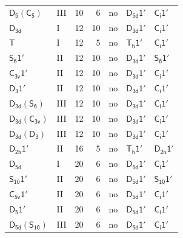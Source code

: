 \documentclass[10pt,a4paper]{article}
\numberwithin{equation}{section}
\newcommand{\grp}[1]{\mathsf{#1}}
\begin{document}
{\begin{longtable}{@{}llrrlll@{}}
\href{D5-C5.pdf}{$\grp{D_{5}}(\grp{C_{5}})$} & III & 10 & 6 & no & \href{D5d-1p.pdf}{$\grp{D_{5d}1'}$} & \href{S2-1p.pdf}{$\grp{C_{i}1'}$}\\
\href{../../../rotation/data/pdf/D3d.pdf}{$\grp{D_{3d}}$} & I & 12 & 10 & no & \href{D3d-1p.pdf}{$\grp{D_{3d}1'}$} & \href{S2-1p.pdf}{$\grp{C_{i}1'}$}\\
\href{../../../rotation/data/pdf/T.pdf}{$\grp{T}$} & I & 12 & 5 & no & \href{Th-1p.pdf}{$\grp{T_{h}1'}$} & \href{S2-1p.pdf}{$\grp{C_{i}1'}$}\\
\href{S6-1p.pdf}{$\grp{S_{6}1'}$} & II & 12 & 10 & no & \href{D3d-1p.pdf}{$\grp{D_{3d}1'}$} & \href{S6-1p.pdf}{$\grp{S_{6}1'}$}\\
\href{C3v-1p.pdf}{$\grp{C_{3v}1'}$} & II & 12 & 10 & no & \href{D3d-1p.pdf}{$\grp{D_{3d}1'}$} & \href{S2-1p.pdf}{$\grp{C_{i}1'}$}\\
\href{D3-1p.pdf}{$\grp{D_{3}1'}$} & II & 12 & 10 & no & \href{D3d-1p.pdf}{$\grp{D_{3d}1'}$} & \href{S2-1p.pdf}{$\grp{C_{i}1'}$}\\
\href{D3d-S6.pdf}{$\grp{D_{3d}}(\grp{S_{6}})$} & III & 12 & 10 & no & \href{D3d-1p.pdf}{$\grp{D_{3d}1'}$} & \href{S2-1p.pdf}{$\grp{C_{i}1'}$}\\
\href{D3d-C3v.pdf}{$\grp{D_{3d}}(\grp{C_{3v}})$} & III & 12 & 10 & no & \href{D3d-1p.pdf}{$\grp{D_{3d}1'}$} & \href{S2-1p.pdf}{$\grp{C_{i}1'}$}\\
\href{D3d-D3.pdf}{$\grp{D_{3d}}(\grp{D_{3}})$} & III & 12 & 10 & no & \href{D3d-1p.pdf}{$\grp{D_{3d}1'}$} & \href{S2-1p.pdf}{$\grp{C_{i}1'}$}\\
\href{D2h-1p.pdf}{$\grp{D_{2h}1'}$} & II & 16 & 5 & no & \href{Th-1p.pdf}{$\grp{T_{h}1'}$} & \href{D2h-1p.pdf}{$\grp{D_{2h}1'}$}\\
\href{../../../rotation/data/pdf/D5d.pdf}{$\grp{D_{5d}}$} & I & 20 & 6 & no & \href{D5d-1p.pdf}{$\grp{D_{5d}1'}$} & \href{S2-1p.pdf}{$\grp{C_{i}1'}$}\\
\href{S10-1p.pdf}{$\grp{S_{10}1'}$} & II & 20 & 6 & no & \href{D5d-1p.pdf}{$\grp{D_{5d}1'}$} & \href{S10-1p.pdf}{$\grp{S_{10}1'}$}\\
\href{C5v-1p.pdf}{$\grp{C_{5v}1'}$} & II & 20 & 6 & no & \href{D5d-1p.pdf}{$\grp{D_{5d}1'}$} & \href{S2-1p.pdf}{$\grp{C_{i}1'}$}\\
\href{D5-1p.pdf}{$\grp{D_{5}1'}$} & II & 20 & 6 & no & \href{D5d-1p.pdf}{$\grp{D_{5d}1'}$} & \href{S2-1p.pdf}{$\grp{C_{i}1'}$}\\
\href{D5d-S10.pdf}{$\grp{D_{5d}}(\grp{S_{10}})$} & III & 20 & 6 & no & \href{D5d-1p.pdf}{$\grp{D_{5d}1'}$} & \href{S2-1p.pdf}{$\grp{C_{i}1'}$}\\

\end{longtable}}
\end{document}
